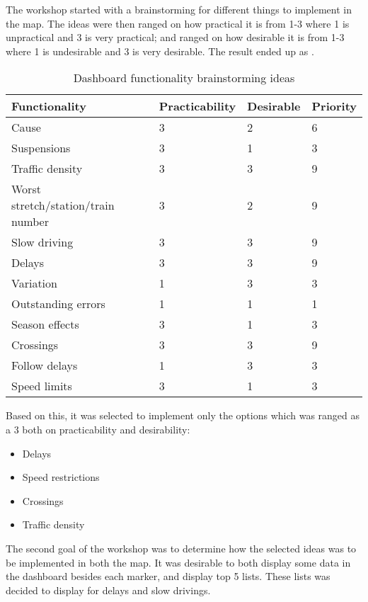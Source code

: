 The workshop started with a brainstorming for different things to implement in
the map. The ideas were then ranged on how practical it is from 1-3 where 1 is
unpractical and 3 is very practical; and ranged on how desirable it is from 1-3
where 1 is undesirable and 3 is very desirable. The result ended up as .

\begin{table}[!h]\small
	\begin{tabularx}{\textwidth}{|X|l|l|l|}
		\hline
		Functionality & Practicability & Desirable & Priority\\
		\hline
		Cause & 3 & 2 & 6\\
		\hline
		Suspensions & 3 & 1 & 3\\
		\hline
		Traffic density & 3 & 3 & 9\\
		\hline
	 	Worst stretch/station/train number & 3 & 2 & 9\\
		\hline
		Slow driving & 3 & 3 & 9\\
		\hline
		Delays & 3 & 3 & 9\\
		\hline
		Variation & 1 & 3 & 3\\
		\hline
		Outstanding errors & 1 & 1 & 1\\
		\hline
		Season effects & 3 & 1 & 3\\
		\hline
		Crossings & 3 & 3 & 9\\
		\hline
		Follow delays & 1 & 3 & 3\\
		\hline
		Speed limits & 3 & 1 & 3\\
		\hline
	\end{tabularx}
\caption{Dashboard functionality brainstorming ideas}
\label{table:dashboard_functionality_wants_vs_needs}
\end{table}

Based on this, it was selected to implement only the options which was ranged
as a 3 both on practicability and desirability:

\begin{itemize}
  \item Delays
  \item Speed restrictions
  \item Crossings
  \item Traffic density
\end{itemize}

The second goal of the workshop was to determine how the selected ideas was to
be implemented in both the map. It was desirable to both display some data in
the dashboard besides each marker, and display top 5 lists. These lists was
decided to display for delays and slow drivings. 

